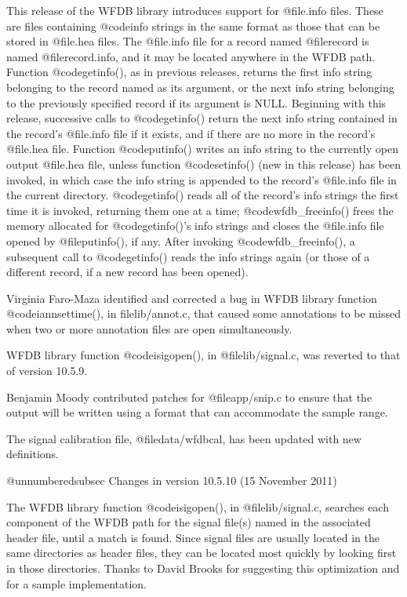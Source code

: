 {{{{{{{{This release of the WFDB library introduces support for @file{.info} files.
These are files containing @code{info} strings in the same format as those that
can be stored in @file{.hea} files.  The @file{.info} file for a record named
@file{record} is named @file{record.info}, and it may be located anywhere in
the WFDB path.  Function @code{getinfo()}, as in previous releases, returns the
first info string belonging to the record named as its argument, or the next
info string belonging to the previously specified record if its argument is
NULL.  Beginning with this release, successive calls to @code{getinfo()} return
the next info string contained in the record's @file{.info} file if it exists,
and if there are no more in the record's @file{.hea} file.  Function
@code{putinfo()} writes an info string to the currently open output @file{.hea}
file, unless function @code{setinfo()} (new in this release) has been invoked,
in which case the info string is appended to the record's @file{.info} file in
the current directory.  @code{getinfo()} reads all of the record's info strings
the first time it is invoked, returning them one at a time;
@code{wfdb_freeinfo()} frees the memory allocated for @code{getinfo()}'s info
strings and closes the @file{.info} file opened by @file{putinfo()}, if any.
After invoking @code{wfdb_freeinfo()}, a subsequent call to @code{getinfo()}
reads the info strings again (or those of a different record, if a new record
has been opened).

Virginia Faro-Maza identified and corrected a bug in WFDB library function
@code{iannsettime()}, in file{lib/annot.c}, that caused some annotations to be
missed when two or more annotation files are open simultaneously.

WFDB library function @code{isigopen()}, in @file{lib/signal.c}, was reverted
to that of version 10.5.9.

Benjamin Moody contributed patches for @file{app/snip.c} to ensure that the
output will be written using a format that can accommodate the sample
range.

The signal calibration file, @file{data/wfdbcal}, has been updated with
new definitions.

@unnumberedsubsec Changes in version 10.5.10 (15 November 2011)

The WFDB library function @code{isigopen()}, in @file{lib/signal.c}, searches
each component of the WFDB path for the signal file(s) named in the associated
header file, until a match is found.  Since signal files are usually located in
the same directories as header files, they can be located most quickly by
looking first in those directories.  Thanks to David Brooks for suggesting this
optimization and for a sample implementation.

}}}}}}}}
